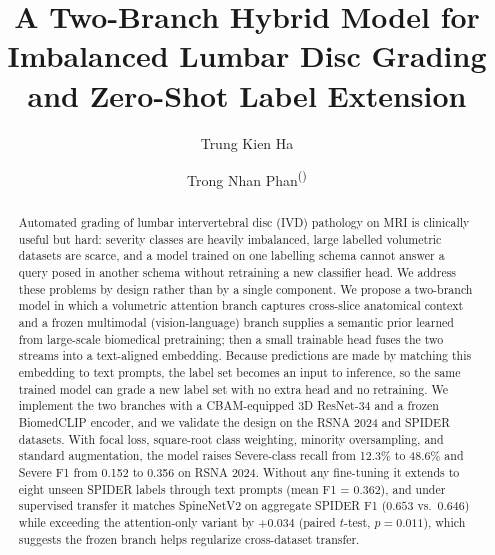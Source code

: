 \documentclass[runningheads]{llncs}
\begin{document}
%
\title{A Two-Branch Hybrid Model for Imbalanced Lumbar Disc Grading and Zero-Shot Label Extension}
%
%
\author{Trung Kien Ha \and
Trong Nhan Phan\textsuperscript{(\Letter)}}
%
\maketitle
%
\begin{abstract}
Automated grading of lumbar intervertebral disc (IVD) pathology on MRI is clinically useful but hard: severity classes are heavily imbalanced, large labelled volumetric datasets are scarce, and a model trained on one labelling schema cannot answer a query posed in another schema without retraining a new classifier head. We address these problems by design rather than by a single component. We propose a two-branch model in which a volumetric attention branch captures cross-slice anatomical context and a frozen multimodal (vision-language) branch supplies a semantic prior learned from large-scale biomedical pretraining; then a small trainable head fuses the two streams into a text-aligned embedding. Because predictions are made by matching this embedding to text prompts, the label set becomes an input to inference, so the same trained model can grade a new label set with no extra head and no retraining. We implement the two branches with a CBAM-equipped 3D ResNet-34 and a frozen BiomedCLIP encoder, and we validate the design on the RSNA 2024 and SPIDER datasets. With focal loss, square-root class weighting, minority oversampling, and standard augmentation, the model raises Severe-class recall from 12.3\% to 48.6\% and Severe F1 from 0.152 to 0.356 on RSNA 2024. Without any fine-tuning it extends to eight unseen SPIDER labels through text prompts (mean F1 = 0.362), and under supervised transfer it matches SpineNetV2 on aggregate SPIDER F1 ($0.653$ vs.\ $0.646$) while exceeding the attention-only variant by $+0.034$ (paired $t$-test, $p=0.011$), which suggests the frozen branch helps regularize cross-dataset transfer.

\end{abstract}
%
\end{document}
